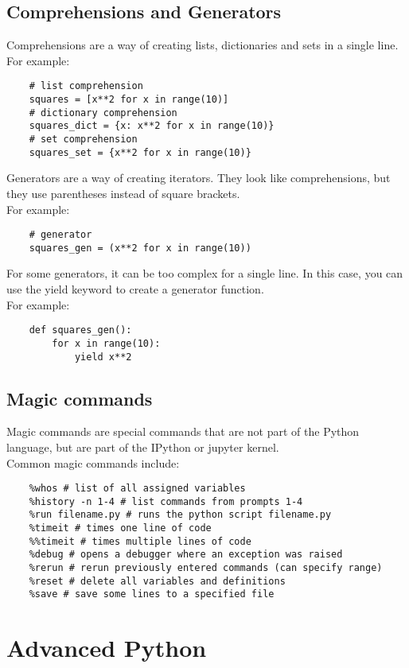 \documentclass[12pt,a4paper]{article}
\begin{document}
\subsection{Comprehensions and Generators}
Comprehensions are a way of creating lists, dictionaries and sets in a single line.\\
For example:
\begin{lstlisting}
    # list comprehension
    squares = [x**2 for x in range(10)]
    # dictionary comprehension
    squares_dict = {x: x**2 for x in range(10)}
    # set comprehension
    squares_set = {x**2 for x in range(10)}
\end{lstlisting}
Generators are a way of creating iterators. They look like comprehensions, but they use parentheses instead of square brackets.\\
For example:
\begin{lstlisting}
    # generator
    squares_gen = (x**2 for x in range(10))
\end{lstlisting}
For some generators, it can be too complex for a single line. In this case, you can use the yield keyword to create a generator function.\\
For example:
\begin{lstlisting}
    def squares_gen():
        for x in range(10):
            yield x**2
\end{lstlisting}
\subsection{Magic commands}
Magic commands are special commands that are not part of the Python language, but are part of the IPython or jupyter kernel.\\
Common magic commands include:
\begin{lstlisting}
    %whos # list of all assigned variables
    %history -n 1-4 # list commands from prompts 1-4
    %run filename.py # runs the python script filename.py
    %timeit # times one line of code
    %%timeit # times multiple lines of code
    %debug # opens a debugger where an exception was raised
    %rerun # rerun previously entered commands (can specify range)
    %reset # delete all variables and definitions
    %save # save some lines to a specified file
\end{lstlisting}

\section{Advanced Python}
\end{document}
